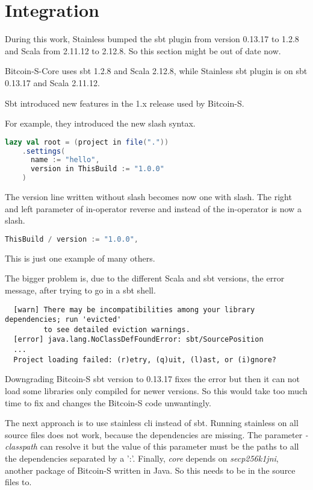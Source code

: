 \section{Integration}
During this work, Stainless bumped the sbt plugin from version 0.13.17 to 1.2.8 and Scala from 2.11.12 to 2.12.8.
So this section might be out of date now.

Bitcoin-S-Core uses sbt 1.2.8 and Scala 2.12.8, while Stainless sbt plugin is on sbt 0.13.17 and Scala 2.11.12.

Sbt introduced new features in the 1.x release used by Bitcoin-S.

For example, they introduced the new slash syntax.
\begin{lstlisting}[language=scala]
  lazy val root = (project in file("."))
    .settings(
      name := "hello",
      version in ThisBuild := "1.0.0"
    )
\end{lstlisting}

The version line written without slash becomes now one with slash.
The right and left parameter of in-operator reverse and instead of the in-operator is now a slash.
\begin{lstlisting}[language=scala]
  ThisBuild / version := "1.0.0",
\end{lstlisting}

This is just one example of many others.

The bigger problem is, due to the different Scala and sbt versions, the error message, after trying to go in a sbt shell.
\begin{lstlisting}
  [warn] There may be incompatibilities among your library dependencies; run 'evicted'
         to see detailed eviction warnings.
  [error] java.lang.NoClassDefFoundError: sbt/SourcePosition
  ...
  Project loading failed: (r)etry, (q)uit, (l)ast, or (i)gnore?
\end{lstlisting}

Downgrading Bitcoin-S sbt version to 0.13.17 fixes the error but then it can not load some libraries only compiled for newer versions.
So this would take too much time to fix and changes the Bitcoin-S code unwantingly.

The next approach is to use stainless cli instead of sbt.
Running stainless on all source files does not work, because the dependencies are missing.
The parameter \emph{-classpath} can resolve it but the value of this parameter must be the paths to all the dependencies separated by a ':'.
Finally, \emph{core} depends on \emph{secp256k1jni}, another package of Bitcoin-S written in Java.
So this needs to be in the source files to.

